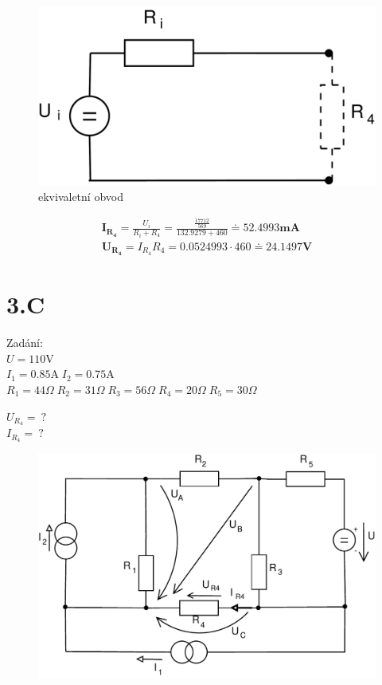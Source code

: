 \documentclass[12pt,a4paper]{article}
\begin{document}
	\begin{figure}[H]
		\center\includegraphics[width=0.6\linewidth]{obr/2_4}
		\caption*{ekvivaletní obvod}
	\end{figure}
	\begin{gather*}
		\boldsymbol{I_{R_4}} = \frac{U_i}{R_i + R_4} = \frac{\frac{17712}{569}}{132.9279 + 460} \doteq \boldsymbol{52.4993 \textbf{mA}} \\
		\boldsymbol{U_{R_4}} = I_{R_4} R_4 = 0.0524993 \cdot 460 \doteq \boldsymbol{24.1497 \textbf{V}}
	\end{gather*}

	\newpage


	\section*{3.C}

	{\Large Zadání:} \\
	$U = 110 \text{V}$ \\
	$I_1 = 0.85 \text{A} \; I_2 = 0.75 \text{A}$ \\
	$R_1 = 44 \Omega \; R_2 = 31 \Omega \; R_3 = 56 \Omega \; R_4 = 20 \Omega \; R_5 = 30 \Omega$

	$U_{R_4} = \: \text{?}$ \\
	$I_{R_4} = \: \text{?}$ \\

	\begin{figure}[H] 
		\center\includegraphics[width=0.6\linewidth]{obr/3_1}
	\end{figure}
\end{document}
